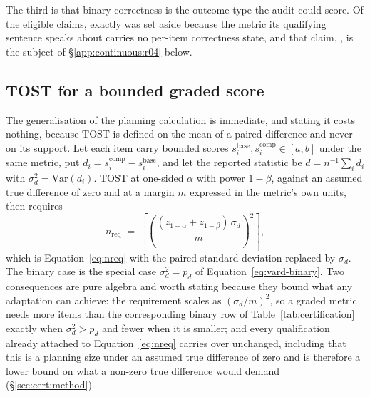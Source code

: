 The third is that binary correctness is the outcome type the audit could score.
Of the eligible claims, exactly \AuditNotAssessableOutsideFramework{} was set
aside because the metric its qualifying sentence speaks about carries no
per-item correctness state, and that claim, \AuditOutsideFrameworkClaim{}, is
the subject of \S\ref{app:continuous:r04} below.

\subsection{TOST for a bounded graded score}
\label{app:continuous:tost}

The generalisation of the planning calculation is immediate, and stating it
costs nothing, because TOST is defined on the mean of a paired difference and
never on its support. Let each item carry bounded scores $s_i^{\mathrm{base}},
s_i^{\mathrm{comp}} \in [a,b]$ under the same metric, put $d_i =
s_i^{\mathrm{comp}} - s_i^{\mathrm{base}}$, and let the reported statistic be
$\bar{d} = n^{-1} \sum_i d_i$ with $\sigma_d^2 = \mathrm{Var}(d_i)$. TOST at
one-sided $\alpha$ with power $1-\beta$, against an assumed true difference of
zero and at a margin $m$ expressed in the metric's own units, then requires
\begin{equation}
n_{\mathrm{req}} \;=\; \left\lceil \left(\frac{(z_{1-\alpha} + z_{1-\beta})\,
\sigma_d}{m}\right)^{\!2} \right\rceil ,
\label{eq:nreq-continuous}
\end{equation}
which is Equation~\eqref{eq:nreq} with the paired standard deviation replaced by
$\sigma_d$. The binary case is the special case $\sigma_d^2 = p_d$ of
Equation~\eqref{eq:vard-binary}. Two consequences are pure algebra and worth
stating because they bound what any adaptation can achieve: the requirement
scales as $(\sigma_d/m)^2$, so a graded metric needs more items than the
corresponding binary row of Table~\ref{tab:certification} exactly when
$\sigma_d^2 > p_d$ and fewer when it is smaller; and every qualification already
attached to Equation~\eqref{eq:nreq} carries over unchanged, including that this
is a planning size under an assumed true difference of zero and is therefore a
lower bound on what a non-zero true difference would demand
(\S\ref{sec:cert:method}).

